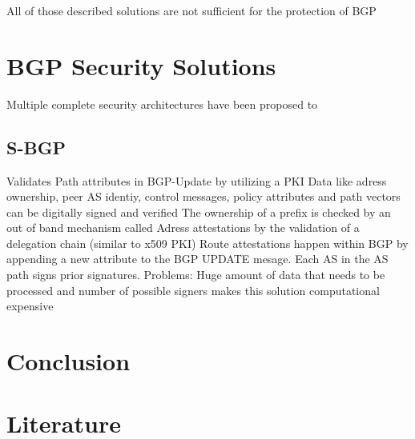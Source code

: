 \documentclass[12pt]{IEEEtran}
\begin{document}
       			
	All of those described solutions are not sufficient for the protection of BGP

       \section{BGP Security Solutions}

       Multiple complete security architectures have been proposed to 
       \subsection{S-BGP}
			Validates Path attributes in BGP-Update by utilizing a PKI
			Data like adress ownership, peer AS identiy, control messages, policy attributes and path vectors can be digitally signed and verified
			The ownership of a prefix is checked by an out of band mechanism called Adress attestations by the validation of a delegation chain (similar to x509 PKI)
			Route attestations happen within BGP by appending a new attribute to the BGP UPDATE mesage. Each AS in the AS path signs prior signatures.
			Problems: 
				Huge amount of data that needs to be processed and number of possible signers makes this solution computational expensive
				
	\section{Conclusion}				

	
	\section{Literature}
\end{document}
